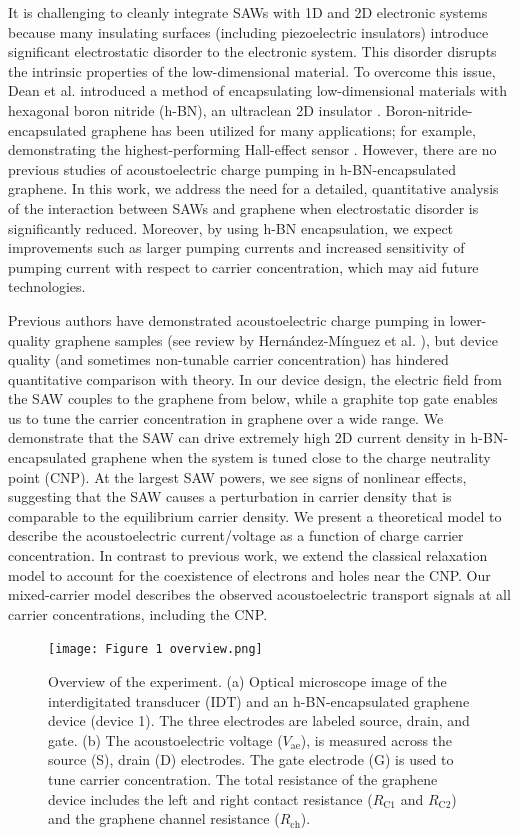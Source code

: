 \documentclass{beavtex_dub_edit}
\begin{document}
It is challenging to cleanly integrate SAWs with 1D and 2D electronic systems because many insulating surfaces (including piezoelectric insulators) introduce significant electrostatic disorder to the electronic system. This disorder disrupts the intrinsic properties of the low-dimensional material. To overcome this issue, Dean et al. introduced a method of encapsulating low-dimensional materials with hexagonal boron nitride (h-BN), an ultraclean 2D insulator \cite{dean_boron_2010}. Boron-nitride-encapsulated graphene has been utilized for many applications; for example, demonstrating the highest-performing Hall-effect sensor \cite{schaefer_magnetic_2020}. However, there are no previous studies of acoustoelectric charge pumping in h-BN-encapsulated graphene. In this work, we address the need for a detailed, quantitative analysis of the interaction between SAWs and graphene when electrostatic disorder is significantly reduced. Moreover, by using h-BN encapsulation, we expect improvements such as larger pumping currents and increased sensitivity of pumping current with respect to carrier concentration, which may aid future technologies. 

Previous authors have demonstrated acoustoelectric charge pumping in lower-quality graphene samples (see review by Hernández-Mínguez et al. \cite{hernandez-minguez_interaction_2018}), but device quality (and sometimes non-tunable carrier concentration) has hindered quantitative comparison with theory. In our device design, the electric field from the SAW couples to the graphene from below, while a graphite top gate enables us to tune the carrier concentration in graphene over a wide range. We demonstrate that the SAW can drive extremely high 2D current density in h-BN-encapsulated graphene when the system is tuned close to the charge neutrality point (CNP). At the largest SAW powers, we see signs of nonlinear effects, suggesting that the SAW causes a perturbation in carrier density that is comparable to the equilibrium carrier density.  We present a theoretical model to describe the acoustoelectric current/voltage as a function of charge carrier concentration. In contrast to previous work, we extend the classical relaxation model to account for the coexistence of electrons and holes near the CNP. Our mixed-carrier model describes the observed acoustoelectric transport signals at all carrier concentrations, including the CNP.

\begin{figure}
    \texttt{[image: Figure 1 overview.png]}
    \caption[Overview of the encapsulated graphene charge pumping experiment.]{Overview of the experiment. (a) Optical microscope image of the interdigitated transducer (IDT) and an h-BN-encapsulated graphene device (device 1). The three electrodes are labeled source, drain, and gate. (b) The acoustoelectric voltage ($V_{\mathrm{ae}}$), is measured across the source (S), drain (D) electrodes. The gate electrode (G) is used to tune carrier concentration. The total resistance of the graphene device includes the left and right contact resistance ($R_{\mathrm{C1}}$  and $R_{\mathrm{C2}}$) and the graphene channel resistance ($R_{\mathrm{ch}}$).}
    \label{AECP Figure 1}
\end{figure}
\end{document}
